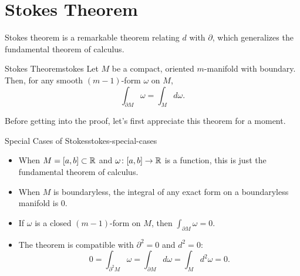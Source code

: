 
\section{Stokes Theorem}

Stokes theorem is a remarkable theorem relating $d$ with $\partial$, which generalizes the fundamental theorem of calculus.

\begin{theorem}{Stokes Theorem}{stokes}
    Let $M$ be a compact, oriented $m$-manifold with boundary. Then, for any smooth $(m-1)$-form $\omega$ on $M$,
    \[
        \int_{\partial M} \omega = \int_M d\omega.
    \]
\end{theorem}

Before getting into the proof, let's first appreciate this theorem for a moment.

\begin{remark}{Special Cases of Stokes}{stokes-special-cases}
    \begin{itemize}
        \item When $M = [a, b] \subset \mathbb{R}$ and $\omega \colon [a, b] \to \mathbb{R}$ is a function, this is just the fundamental theorem of calculus.
        \item When $M$ is boundaryless, the integral of any exact form on a boundaryless manifold is $0$.
        \item If $\omega$ is a closed $(m-1)$-form on $M$, then $\int_{\partial M} \omega = 0$.
        \item The theorem is compatible with $\partial^2 = 0$ and $d^2 = 0$:
        \[
            0 = \int_{\partial^2 M} \omega = \int_{\partial M} d\omega = \int_M d^2 \omega = 0.
        \]
    \end{itemize}
\end{remark}

